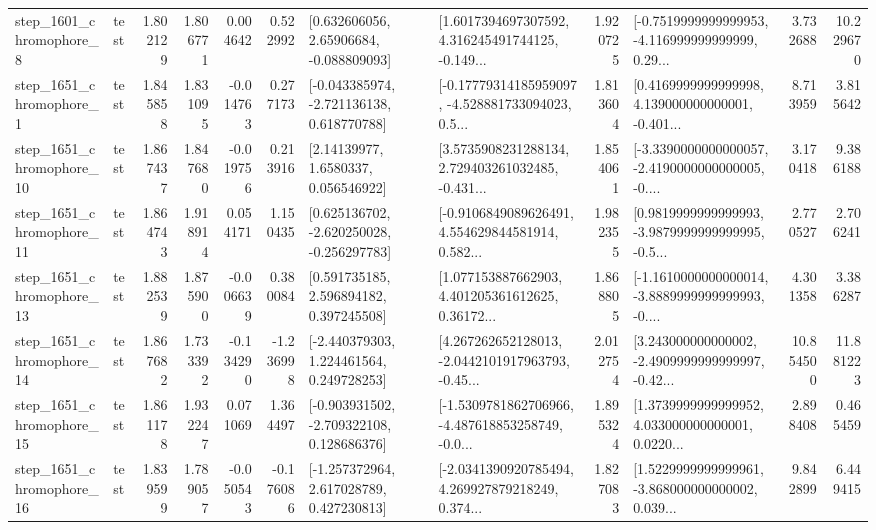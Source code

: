 \begin{tabular}{llrrrrllrlrr}
  step\_1601\_chromophore\_8 &      test &      1.802129 &    1.806771 &      0.004642 &  0.522992 &     [0.632606056, 2.65906684, -0.088809093] &  [1.6017394697307592, 4.316245491744125, -0.149... &       1.920725 &  [-0.7519999999999953, -4.116999999999999, 0.29... &            3.732688 &         10.229670 \\
  step\_1651\_chromophore\_1 &      test &      1.845858 &    1.831095 &     -0.014763 &  0.277173 &   [-0.043385974, -2.721136138, 0.618770788] &  [-0.17779314185959097, -4.528881733094023, 0.5... &       1.813604 &  [0.4169999999999998, 4.139000000000001, -0.401... &            8.713959 &          3.815642 \\
 step\_1651\_chromophore\_10 &      test &      1.867437 &    1.847680 &     -0.019756 &  0.213916 &        [2.14139977, 1.6580337, 0.056546922] &  [3.5735908231288134, 2.729403261032485, -0.431... &       1.854061 &  [-3.3390000000000057, -2.4190000000000005, -0.... &            3.170418 &          9.386188 \\
 step\_1651\_chromophore\_11 &      test &      1.864743 &    1.918914 &      0.054171 &  1.150435 &   [0.625136702, -2.620250028, -0.256297783] &  [-0.9106849089626491, 4.554629844581914, 0.582... &       1.982355 &  [0.9819999999999993, -3.9879999999999995, -0.5... &            2.770527 &          2.706241 \\
 step\_1651\_chromophore\_13 &      test &      1.882539 &    1.875900 &     -0.006639 &  0.380084 &     [0.591735185, 2.596894182, 0.397245508] &  [1.077153887662903, 4.401205361612625, 0.36172... &       1.868805 &  [-1.1610000000000014, -3.8889999999999993, -0.... &            4.301358 &          3.386287 \\
 step\_1651\_chromophore\_14 &      test &      1.867682 &    1.733392 &     -0.134290 & -1.236998 &    [-2.440379303, 1.224461564, 0.249728253] &  [4.267262652128013, -2.0442101917963793, -0.45... &       2.012754 &  [3.243000000000002, -2.4909999999999997, -0.42... &           10.854500 &         11.881223 \\
 step\_1651\_chromophore\_15 &      test &      1.861178 &    1.932247 &      0.071069 &  1.364497 &   [-0.903931502, -2.709322108, 0.128686376] &  [-1.5309781862706966, -4.487618853258749, -0.0... &       1.895324 &  [1.3739999999999952, 4.033000000000001, 0.0220... &            2.898408 &          0.465459 \\
 step\_1651\_chromophore\_16 &      test &      1.839599 &    1.789057 &     -0.050543 & -0.176086 &    [-1.257372964, 2.617028789, 0.427230813] &  [-2.0341390920785494, 4.269927879218249, 0.374... &       1.827083 &  [1.5229999999999961, -3.868000000000002, 0.039... &            9.842899 &          6.449415 \\

\end{tabular}
